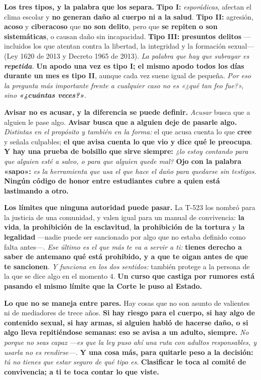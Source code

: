 \documentclass[11pt,letterpaper]{article}
\newcommand{\milcpaso}[3]{%
\Needspace{4\baselineskip}%
\begin{tcolorbox}[enhanced,colback=white,colframe=milcLinea,arc=1.5mm,boxrule=.9pt,
  left=14mm,right=4mm,top=3mm,bottom=3mm,before skip=4pt,after skip=4pt,
  fontupper=\RaggedRight,
  overlay={\node[anchor=north west,circle,fill=#2,text=white,inner sep=0pt,
    minimum size=7.4mm,font=\sffamily\bfseries\small]
    at ([xshift=3.6mm,yshift=-3.2mm]frame.north west) {#1};}]
#3
\end{tcolorbox}}
\begin{document}
\milcpaso{1}{milcTurquesa}{\textbf{Los tres tipos, y la palabra que los separa.} \textbf{Tipo I:} \emph{esporádicas}, afectan el clima escolar y \textbf{no generan daño al cuerpo ni a la salud}. \textbf{Tipo II:} agresión, \textbf{acoso} y \textbf{ciberacoso} que \textbf{no son delito}, pero que \textbf{se repiten o son sistemáticas}, o causan daño sin incapacidad. \textbf{Tipo III:} \textbf{presuntos delitos} ---incluidos los que atentan contra la libertad, la integridad y la formación sexual--- (Ley 1620 de 2013 y Decreto 1965 de 2013). \emph{La palabra que hay que subrayar es \textbf{repetida}.} \textbf{Un apodo una vez es tipo I; el mismo apodo todos los días durante un mes es tipo II}, aunque cada vez suene igual de pequeña. \emph{Por eso la pregunta más importante frente a cualquier caso no es «¿qué tan feo fue?», sino \textbf{«¿cuántas veces?»}.}}
\milcpaso{2}{milcTurquesa}{\textbf{Avisar no es acusar, y la diferencia se puede definir.} \emph{Acusar} busca que a alguien le pase algo. \textbf{Avisar busca que a alguien deje de pasarle algo.} \emph{Distintas en el propósito y también en la forma:} el que acusa cuenta lo que \textbf{cree} y señala culpables; \textbf{el que avisa cuenta lo que vio y dice qué le preocupa}. \textbf{Y hay una prueba de bolsillo que sirve siempre:} \emph{¿lo estoy contando para que alguien esté a salvo, o para que alguien quede mal?} \textbf{Ojo con la palabra «sapo»:} \emph{es la herramienta que usa el que hace el daño para quedarse sin testigos.} \textbf{Ningún código de honor entre estudiantes cubre a quien está lastimando a otro.}}
\milcpaso{3}{milcTurquesa}{\textbf{Los límites que ninguna autoridad puede pasar.} La T-523 los nombró para la justicia de una comunidad, y valen igual para un manual de convivencia: \textbf{la vida}, \textbf{la prohibición de la esclavitud}, \textbf{la prohibición de la tortura} y \textbf{la legalidad} ---nadie puede ser sancionado por algo que no estaba definido como falta antes---. \emph{Ese último es el que más te va a servir a ti:} \textbf{tienes derecho a saber de antemano qué está prohibido, y a que te oigan antes de que te sancionen}. \emph{Y funciona en los dos sentidos:} también protege a la persona de la que se dice algo en el momento 4. \textbf{Un curso que castiga por rumores está pasando el mismo límite que la Corte le puso al Estado.}}
\milcpaso{4}{milcTurquesa}{\textbf{Lo que no se maneja entre pares.} Hay cosas que no son asunto de valientes ni de mediadores de trece años. \textbf{Si hay riesgo para el cuerpo, si hay algo de contenido sexual, si hay armas, si alguien habló de hacerse daño, o si algo lleva repitiéndose semanas: eso se avisa a un adulto, siempre.} \emph{No porque no seas capaz ---es que la ley puso ahí una ruta con adultos responsables, y usarla no es rendirse---.} \textbf{Y una cosa más, para quitarle peso a la decisión:} \emph{tú no tienes que estar seguro de qué tipo es}. \textbf{Clasificar le toca al comité de convivencia; a ti te toca contar lo que viste.}}
\end{document}
